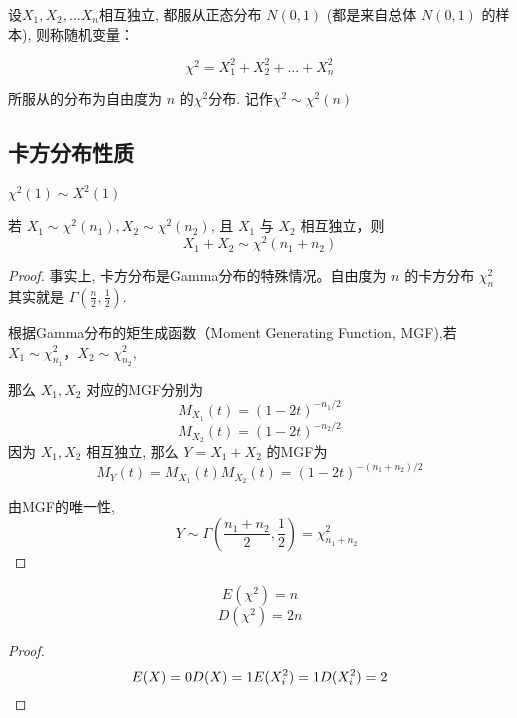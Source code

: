 \begin{definition}[卡方分布]
    设$X_1,X_2,...X_n$相互独立, 都服从正态分布 $N(0,1)$ (都是来自总体 $N(0,1)$ 的样本), 则称随机变量：

    $$
        \chi^2 = X_1^2 + X_2^2 + ... + X_n^2
    $$

    所服从的分布为自由度为 $n$ 的$\chi^2$分布. 记作$\chi^2 \sim \chi^2(n)$
\end{definition}

\subsection{卡方分布性质}

\begin{corollary}
    $\chi^2(1) \sim X^2(1)$
\end{corollary}

\begin{corollary}
    若 $ X_{1} \sim \chi^{2}\left(n_{1}\right), X_{2} \sim \chi^{2}\left(n_{2}\right) $, 且 $ X_{1} $ 与 $ X_{2} $ 相互独立，则
    $$
        X_{1}+X_{2} \sim \chi^{2}\left(n_{1}+n_{2}\right)
    $$
\end{corollary}

\begin{proof}
    事实上, 卡方分布是Gamma分布的特殊情况。自由度为 $ n $ 的卡方分布 $ \chi_{n}^{2} $ 其实就是 $ \Gamma\left(\frac{n}{2}, \frac{1}{2}\right) $.

    根据Gamma分布的矩生成函数（Moment Generating Function, MGF),若$ X_{1} \sim \chi_{n_{1}}^{2} $，$ X_{2} \sim \chi_{n_{2}}^{2} $,

    那么 $ X_{1}, X_{2} $ 对应的MGF分别为
    $$ M_{X_{1}}(t)=(1-2 t)^{-n_{1} / 2} $$
    $$ M_{X_{2}}(t)=(1-2 t)^{-n_{2} / 2} $$
    因为 $ X_{1}, X_{2} $ 相互独立, 那么 $ Y=X_{1}+X_{2} $ 的MGF为
    $$ M_{Y}(t)=M_{X_{1}}(t) M_{X_{2}}(t)=(1-2 t)^{-\left(n_{1}+n_{2}\right) / 2} $$

    由MGF的唯一性,
    $$ \quad Y \sim \Gamma\left(\frac{n_{1}+n_{2}}{2}, \frac{1}{2}\right)=\chi_{n_{1}+n_{2}}^{2} $$
\end{proof}

\begin{corollary}
    $$E(\chi^2) = n$$
    $$D(\chi^2) = 2n$$
\end{corollary}

\begin{proof}
    $$
        E(X) = 0\\
        D(X) = 1\\
        E(X_i^2) = 1\\
        D(X_i^2) = 2
    $$
\end{proof}

